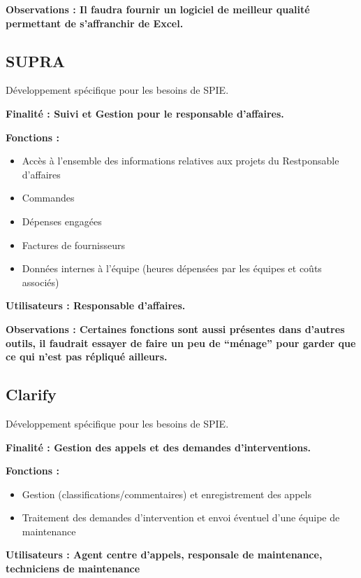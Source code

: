 \bf{Observations :} Il faudra fournir un logiciel de meilleur qualité permettant de s’affranchir de Excel.


\subsection{SUPRA}
Développement spécifique pour les besoins de SPIE.
\begin{description}
    \item \bf{Finalité :} Suivi et Gestion pour le responsable d’affaires. \\
    \item \bf{Fonctions :}
    \begin{itemize}
        \item Accès à l’ensemble des informations relatives aux projets du Restponsable d’affaires
        \item Commandes
        \item Dépenses engagées
        \item Factures de fournisseurs
        \item Données internes à l’équipe (heures dépensées par les équipes et coûts associés) \\
    \end{itemize}
    \item \bf{Utilisateurs :} Responsable d’affaires. \\
\end{description}

\bf{Observations :} Certaines fonctions sont aussi présentes dans d’autres outils, il faudrait essayer de faire un peu de “ménage” pour garder que ce qui n’est pas répliqué ailleurs.


\subsection{Clarify}
Développement spécifique pour les besoins de SPIE.
\begin{description}
    \item \bf{Finalité :} Gestion des appels et des demandes d’interventions. \\
    \item \bf{Fonctions :} 
    \begin{itemize}
        \item Gestion (classifications/commentaires) et enregistrement des appels
        \item Traitement des demandes d’intervention et envoi éventuel d’une équipe de maintenance \\
    \end{itemize}
    \item \bf{Utilisateurs :} Agent centre d’appels, responsale de maintenance, techniciens de maintenance
\end{description}

